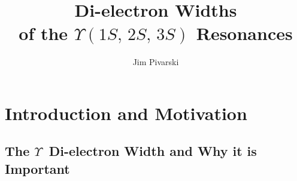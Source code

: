 \documentclass{cornell}
\title{Di-electron Widths \\ of the $\Upsilon(1S,\,2S,\,3S)$ Resonances}
\author{Jim Pivarski}
\begin{document}
\newcommand{\subs}[1]{{\mbox{\scriptsize #1}}}
\newcommand{\inv}{$^{-1}$}
\newcommand{\PM}{$\pm$}
\newcommand{\ups}{$\Upsilon$}
\newcommand{\gee}{$\Gamma_{ee}$}
\newcommand{\us}{$\Upsilon(1S)$}
\newcommand{\uss}{$\Upsilon(2S)$}
\newcommand{\usss}{$\Upsilon(3S)$}
\newcommand{\es}{$\epsilon_{1S}$}
\newcommand{\ess}{$\epsilon_{2S}$}
\newcommand{\esss}{$\epsilon_{3S}$}
\newcommand{\ee}{$e^+e^-$}
\newcommand{\mumu}{$\mu^+\mu^-$}
\newcommand{\tautau}{$\tau^+\tau^-$}
\newcommand{\gamgam}{$\gamma\gamma$}
\newcommand{\ggg}{$ggg$}
\newcommand{\gggamma}{$gg\gamma$}
\newcommand{\qqbar}{$q\bar{q}$}
\newcommand{\bee}{${\mathcal B}_{ee}$}
\newcommand{\bmm}{${\mathcal B}_{\mu\mu}$}
\newcommand{\btt}{${\mathcal B}_{\tau\tau}$}
\newcommand{\bcas}{${\mathcal B}_\subs{cas}$}
\newcommand{\geehadtot}{$\Gamma_{ee}\Gamma_\subs{had}/\Gamma_\subs{tot}$}
\newcommand{\twotoone}{$\Upsilon(2S) \to \pi^+\pi^- \Upsilon(1S)$}
\newcommand{\pipi}{$\pi^+\pi^-$}
\newcommand{\evis}{$\epsilon_\subs{vis}$}
\newcommand{\ecuts}{$\epsilon_\subs{cuts}$}
\newcommand{\ebeam}{$E_\subs{beam}$}
\newcommand{\ecm}{$E_\subs{CM}$}
\newcommand{\pmax}{$|\vec{p}_\subs{max}|$}
\newcommand{\visen}{$E_\subs{vis}$}
\newcommand{\dxy}{$d_\subs{XY}$}
\newcommand{\dz}{$d_\subs{Z}$}
\newcommand{\vtd}{$V_{td}$}
\newcommand{\twotrack}{{\tt two-track}}
\newcommand{\hadron}{{\tt hadron}}
\newcommand{\radtau}{{\tt rad-tau}}
\newcommand{\eltrack}{{\tt $e^\pm$-track}}
\newcommand{\barrelbhabha}{{\tt barrel-bhabha}}
\newcommand{\axial}{{\tt AXIAL}}
\newcommand{\stereo}{{\tt STEREO}}
\newcommand{\cblo}{{\tt CBLO}}
\newcommand{\cbmd}{{\tt CBMD}}
\newcommand{\cbhi}{{\tt CBHI}}

\newcommand{\bork}{{\sc bork!}}
\newcommand{\borky}{{\sc bork?}}
\newcommand{\borkborkbork}{\mbox{\sc bork! bork! bork!}}

\normalspacing
\setcounter{page}{1}
\pagestyle{cornellc}


\maketitle
\tableofcontents

\chapter{Introduction and Motivation}
\label{chp:introduction}

\section{The \boldmath \ups\ Di-electron Width and Why it is Important}
\end{document}
